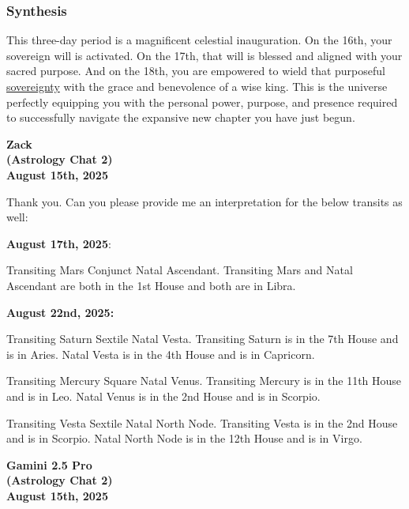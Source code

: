 \documentclass{article}
\begin{document}
\subsubsection*{Synthesis}\label{synthesis}

This three-day period is a magnificent celestial inauguration. On the 16th, your sovereign will is activated. On the 17th, that will is blessed and aligned with your sacred purpose. And on the 18th, you are empowered to wield that purposeful \hyperlink{gloss:sovereignty}{sovereignty} with the grace and benevolence of a wise king. This is the universe perfectly equipping you with the personal power, purpose, and presence required to successfully navigate the expansive new chapter you have just begun.


\begin{center}
\textbf{Zack} \\
\textbf{(Astrology Chat 2)} \\
\textbf{August 15th, 2025} 
\end{center}

Thank you. Can you please provide me an interpretation for the below transits as well:

\textbf{August 17th, 2025}:

Transiting Mars Conjunct Natal Ascendant. Transiting Mars and Natal Ascendant are both in the 1st House and both are in Libra.

\textbf{August 22nd, 2025:}

Transiting Saturn Sextile Natal Vesta. Transiting Saturn is in the 7th House and is in Aries. Natal Vesta is in the 4th House and is in Capricorn.

Transiting Mercury Square Natal Venus. Transiting Mercury is in the 11th House and is in Leo. Natal Venus is in the 2nd House and is in Scorpio.

Transiting Vesta Sextile Natal North Node. Transiting Vesta is in the 2nd House and is in Scorpio. Natal North Node is in the 12th House and is in Virgo.

\begin{center}
\textbf{Gamini 2.5 Pro} \\
\textbf{(Astrology Chat 2)} \\
\textbf{August 15th, 2025}
\end{center}
\end{document}
